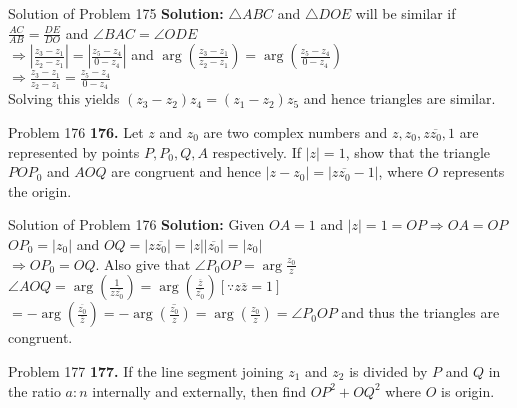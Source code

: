 \documentclass[aspectratio=169,8pt]{beamer}
\begin{document}
\begin{frame}{Solution of Problem 175}
  \textbf{Solution:} $\triangle ABC$ and $\triangle DOE$ will be similar if\\
  \vspace*{0.2cm}
  $\frac{AC}{AB} = \frac{DE}{DO}$ and $\angle BAC = \angle ODE$\\
  \vspace*{0.2cm}
  $\Rightarrow \left|\frac{z_3 - z_1}{z_2 - z_1}\right| = \left|\frac{z_5 - z_4}{0 - z_4}\right|$ and $\arg\left(\frac{z_3 - z_1}{z_2
    - z_1}\right) = \arg\left(\frac{z_5 - z_4}{0 - z_4}\right)$\\
  \vspace*{0.2cm}
  $\Rightarrow \frac{z_3 - z_1}{z_2 - z_1} = \frac{z_5 - z_4}{0 - z_4}$\\
  \vspace*{0.2cm}
  Solving this yields $(z_3 - z_2)z_4 = (z_1 - z_2)z_5$ and hence triangles are similar.
\end{frame}
\begin{frame}{Problem 176}
  \textbf{176.} Let $z$ and $z_0$ are two complex numbers and $z, z_0, z\overline{z_0}, 1$ are represented by points $P, P_0, Q, A$
  respectively. If $|z| = 1$, show that the triangle $POP_0$ and $AOQ$ are congruent and hence $|z - z_0| = |z\overline{z_0} - 1|$,
  where $O$ represents the origin.
\end{frame}
\begin{frame}{Solution of Problem 176}
  \textbf{Solution:} Given $OA = 1$ and $|z| = 1 = OP \Rightarrow OA = OP$\\
  \vspace*{0.2cm}
  $OP_0 = |z_0|$ and $OQ = |z\overline{z_0}| = |z||\overline{z_0}| = |z_0|$\\
  \vspace*{0.2cm}
  $\Rightarrow OP_0 = OQ$. Also give that $\angle P_0OP = \arg\frac{z_0}{z}$\\
  \vspace*{0.2cm}
  $\angle AOQ = \arg\left(\frac{1}{z\overline{z_0}}\right) = \arg\left(\frac{\overline{z}}{\overline{z_0}}\right)[\because
    z\overline{z} = 1]$\\
  \vspace*{0.2cm}
  $= -\arg\left(\frac{\overline{z_0}}{\overline{z}}\right)= -\arg\overline{\left(\frac{z_0}{z}\right)} =
  \arg\left(\frac{z_0}{z}\right) = \angle P_0OP$ and thus the triangles are congruent.
\end{frame}
\begin{frame}{Problem 177}
  \textbf{177.} If the line segment joining $z_1$ and $z_2$ is divided by $P$ and $Q$ in the ratio $a:n$ internally and externally,
  then find $OP^2 + OQ^2$ where $O$ is origin.
\end{frame}
\end{document}
